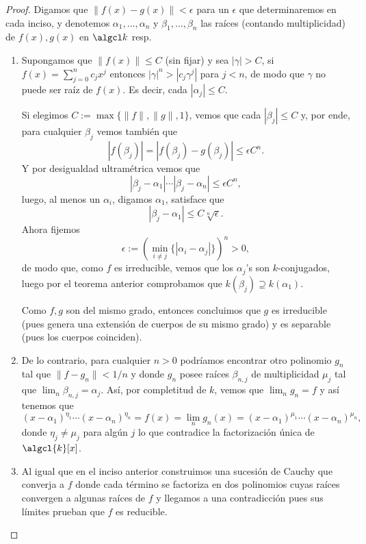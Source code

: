 \documentclass[teoria-numeros.tex]{subfiles}
\begin{document}
\begin{proof}
	Digamos que $\|f(x) - g(x)\| < \epsilon$ para un $\epsilon$ que determinaremos en cada inciso,
	y denotemos $\alpha_1, \dots, \alpha_n$ y $\beta_1, \dots, \beta_n$ las raíces (contando multiplicidad) de $f(x), g(x)$ en $\algcl k$ resp.
	\begin{enumerate}
		\item Supongamos que $\|f(x)\| \le C$ (sin fijar) y sea $|\gamma| > C$,
			si $f(x) = \sum_{j=0}^{n} c_j x^j$ entonces $|\gamma|^n > |c_j\gamma^j|$ para $j < n$, de modo que $\gamma$ no puede ser raíz de $f(x)$.
			Es decir, cada $|\alpha_j| \le C$.

			Si elegimos $C := \max\{ \|f\|, \|g\|, 1 \}$, vemos que cada $|\beta_j| \le C$ y, por ende,
			para cualquier $\beta_j$ vemos también que
			$$ |f(\beta_j)| = |f(\beta_j) - g(\beta_j)| \le \epsilon C^n. $$
			Y por desigualdad ultramétrica vemos que
			$$ |\beta_j - \alpha_1| \cdots |\beta_j - \alpha_n| \le \epsilon C^n, $$
			luego, al menos un $\alpha_i$, digamos $\alpha_1$, satisface que
			$$ |\beta_j - \alpha_1| \le C \sqrt[n]{\epsilon}. $$
			Ahora fijemos
			$$ \epsilon := \left( \min_{i\ne j} \{ |\alpha_i - \alpha_j| \} \right)^n > 0, $$
			de modo que, como $f$ es irreducible, vemos que los $\alpha_j$'s son $k$-conjugados,
			luego por el teorema anterior comprobamos que $k(\beta_j) \supseteq k(\alpha_1)$.

			Como $f, g$ son del mismo grado, entonces concluimos que $g$ es irreducible (pues genera una extensión de cuerpos de su mismo grado)
			y es separable (pues los cuerpos coinciden).

		\item De lo contrario, para cualquier $n > 0$ podríamos encontrar otro polinomio $g_n$ tal que $\|f - g_n\| < 1/n$
			y donde $g_n$ posee raíces $\beta_{n, j}$ de multiplicidad $\mu_j$ tal que $\lim_n \beta_{n, j} = \alpha_j$.
			Así, por completitud de $k$, vemos que $\lim_n g_n = f$ y así tenemos que
			$$ (x - \alpha_1)^{\eta_1} \cdots (x - \alpha_n)^{\eta_n} = f(x) = \lim_n g_n(x) = (x - \alpha_1)^{\mu_1} \cdots (x - \alpha_n)^{\mu_n}, $$
			donde $\eta_j \ne \mu_j$ para algún $j$ lo que contradice la factorización única de $\algcl{k}[x]$.

		\item Al igual que en el inciso anterior construimos una sucesión de Cauchy que converja a $f$ donde cada término se factoriza en dos polinomios
			cuyas raíces convergen a algunas raíces de $f$ y llegamos a una contradicción pues sus límites prueban que $f$ es reducible. \qedhere
	\end{enumerate}
\end{proof}
\end{document}
